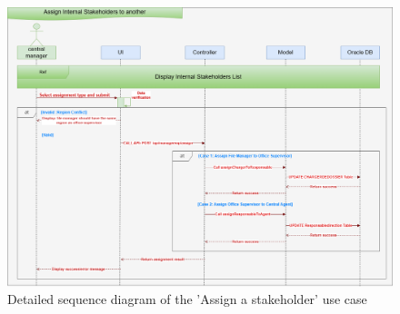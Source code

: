 \begin{figure}[h!]
    \centering
    \includegraphics[width=1\textwidth]{figures/det Manages Internal Stakeholders assign.png}
    \caption{Detailed sequence diagram of the 'Assign a stakeholder' use case}
\end{figure}
\clearpage
